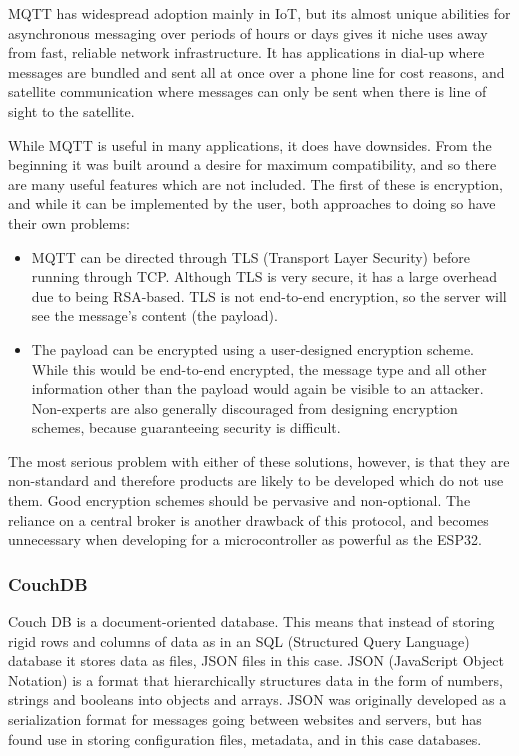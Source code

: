 \documentclass{article}
\begin{document}
MQTT has widespread adoption mainly in IoT, but its almost unique abilities for asynchronous messaging over periods of hours or days gives it niche uses away from fast, reliable network infrastructure. It has applications in dial-up where messages are bundled and sent all at once over a phone line for cost reasons, and satellite communication where messages can only be sent when there is line of sight to the satellite.

While MQTT is useful in many applications, it does have downsides. From the beginning it was built around a desire for maximum compatibility, and so there are many useful features which are not included. The first of these is encryption, and while it can be implemented by the user, both approaches to doing so have their own problems:
\begin{itemize}
\item MQTT can be directed through TLS (Transport Layer Security) before running through TCP. Although TLS is very secure, it has a large overhead due to being RSA-based. TLS is not end-to-end encryption, so the server will see the message's content (the payload).
\item The payload can be encrypted using a user-designed encryption scheme. While this would be end-to-end encrypted, the message type and all other information other than the payload would again be visible to an attacker. Non-experts are also generally discouraged from designing encryption schemes, because guaranteeing security is difficult.
\end{itemize}

The most serious problem with either of these solutions, however, is that they are non-standard and therefore products are likely to be developed which do not use them. Good encryption schemes should be pervasive and non-optional. The reliance on a central broker is another drawback of this protocol, and becomes unnecessary when developing for a microcontroller as powerful as the ESP32.

\subsubsection{CouchDB}

Couch DB is a document-oriented database. This means that instead of storing rigid rows and columns of data as in an SQL (Structured Query Language) database it stores data as files, JSON files in this case. JSON (JavaScript Object Notation) is a format that hierarchically structures data in the form of numbers, strings and booleans into objects and arrays. JSON was originally developed as a serialization format for messages going between websites and servers, but has found use in storing configuration files, metadata, and in this case databases.
\end{document}
